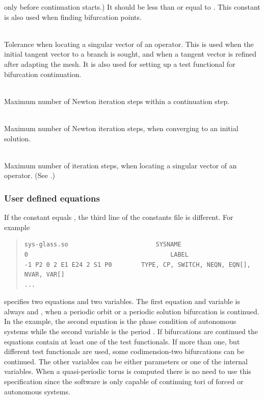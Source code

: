 \documentclass[10pt,a4paper]{ddedoc}
\begin{document}
\begin{description}
only before continuation starts.) It should be less than or equal to
. This constant is also used when finding bifurcation points.
%
\item[\funp{EPSK}] ~\\
Tolerance when locating a singular vector of an operator. This is used when the initial tangent vector to a branch is sought,
and when a tangent vector is refined after adapting the mesh. It is also used for setting up a test functional for bifurcation continuation.
%
\item[\funp{NITC}] ~\\
Maximum number of Newton iteration steps within a continuation step.
%
\item[\funp{NITR}] ~\\
Maximum number of Newton iteration steps, when converging to an initial
solution.
%
\item[\funp{NITK}] ~\\
Maximum number of iteration steps, when locating a singular vector of an operator. (See .)
%
\end{description}

\subsubsection{User defined equations}
\label{extendedsys}

If the  constant equals , the third line of the constants
file is different. For example
{ \small \begin{quote} \begin{lstlisting}[basicstyle=\tt,frame=single]
sys-glass.so						SYSNAME
0										LABEL
-1 P2 0 2 E1 E24 2 S1 P0		TYPE, CP, SWITCH, NEQN, EQN[], NVAR, VAR[]
...
\end{lstlisting} \end{quote} } \noindent
specifies two equations and two variables. The first equation and variable is
always  and , when a periodic orbit or a periodic solution
bifurcation is continued. In the example, the second equation  is the
phase condition of autonomous systems while the second variable is the period
. If bifurcations are continued the equations contain at least one of
the test functionals. If more than one, but different test functionals are used,
some codimension-two bifurcations can be continued. The other variables can be
either parameters or one of the internal variables. When a quasi-periodic torus
is computed there is no need to use this specification since the
software is only capable of continuing tori of forced or autonomous systems.
\end{document}
